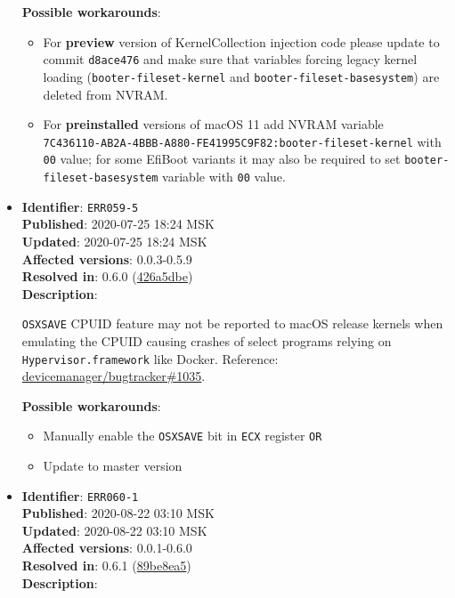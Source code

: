 \documentclass[]{article}
\providecommand{\tightlist}{%
  \setlength{\itemsep}{0pt}\setlength{\parskip}{0pt}}
\begin{document}
\begin{itemize}
  \textbf{Possible workarounds}:
  \begin{itemize}
    \tightlist
    \item For \textbf{preview} version of KernelCollection injection code please update
    to commit \texttt{d8ace476} and make sure that variables forcing legacy
    kernel loading (\texttt{booter-fileset-kernel} and \texttt{booter-fileset-basesystem})
    are deleted from NVRAM.
    \item For \textbf{preinstalled} versions of macOS 11 add NVRAM variable \\
    \texttt{7C436110-AB2A-4BBB-A880-FE41995C9F82:booter-fileset-kernel}
    with \texttt{00} value; for some EfiBoot variants it may also be
    required to set \texttt{booter-fileset-basesystem} variable with \texttt{00} value.
  \end{itemize}


\item
  \textbf{Identifier}: \texttt{ERR059-5} \\
  \textbf{Published}: 2020-07-25 18:24 MSK \\
  \textbf{Updated}: 2020-07-25 18:24 MSK \\
  \textbf{Affected versions}: 0.0.3-0.5.9 \\
  \textbf{Resolved in}: 0.6.0 (\href{https://github.com/devicemanager/OpenCorePkg/commit/426a5dbe09365d3fe1d18dbde9868fe12900c30c}{426a5dbe}) \\
  \textbf{Description}:

  \texttt{OSXSAVE} CPUID feature may not be reported to macOS release kernels when emulating the CPUID
  causing crashes of select programs relying on \texttt{Hypervisor.framework} like Docker. Reference:
  \href{https://github.com/devicemanager/bugtracker/issues/1035}{devicemanager/bugtracker\#1035}.

  \textbf{Possible workarounds}:
  \begin{itemize}
    \tightlist
    \item Manually enable the \texttt{OSXSAVE} bit in \texttt{ECX} register \texttt{OR}
    \item Update to master version
  \end{itemize}

\item
  \textbf{Identifier}: \texttt{ERR060-1} \\
  \textbf{Published}: 2020-08-22 03:10 MSK \\
  \textbf{Updated}: 2020-08-22 03:10 MSK \\
  \textbf{Affected versions}: 0.0.1-0.6.0 \\
  \textbf{Resolved in}: 0.6.1 (\href{https://github.com/devicemanager/OpenCorePkg/commit/89be8ea5bb98dc8c9eb49a5e29c5343643535ae4}{89be8ea5}) \\
  \textbf{Description}:


\end{itemize}
\end{document}
